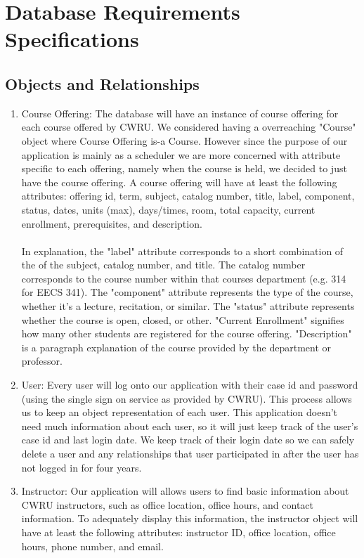 \documentclass[pdftex,12pt,letter]{article}
\begin{document}
\section*{Database Requirements Specifications}
\subsection*{Objects and Relationships}
\begin{enumerate}[1.]
\item Course Offering: The database will have an instance of course offering for each course offered by CWRU. We considered having a overreaching "Course" object where Course Offering is-a Course. However since the purpose of our application is mainly as a scheduler we are more concerned with attribute specific to each offering, namely when the course is held, we decided to just have the course offering. A course offering will have at least the following attributes: offering id, term, subject, catalog number, title, label, component, status, dates, units (max), days/times, room, total capacity, current enrollment, prerequisites, and description.\\\\ In explanation, the "label" attribute corresponds to a short combination of the of the subject, catalog number, and title. The catalog number corresponds to the course number within that courses department (e.g. 314 for EECS 341). The "component" attribute represents the type of the course, whether it's a lecture, recitation, or similar. The "status" attribute represents whether the course is  open, closed, or other. "Current Enrollment" signifies how many other students are registered for the course offering. "Description" is a paragraph explanation of the course provided by the department or professor.
\item User: Every user will log onto our application with their case id and password (using the single sign on service as provided by CWRU). This process allows us to keep an object representation of each user. This application doesn't need much information about each user, so it will just keep track of the user's case id and last login date. We keep track of their login date so we can safely delete a user and any relationships that user participated in after the user has not logged in for four years.
\item Instructor: Our application will allows users to find basic information about CWRU instructors, such as office location, office hours, and contact information. To adequately display this information, the instructor object will have at least the following attributes: instructor ID, office location, office hours, phone number, and email.

\end{enumerate}
\end{document}
